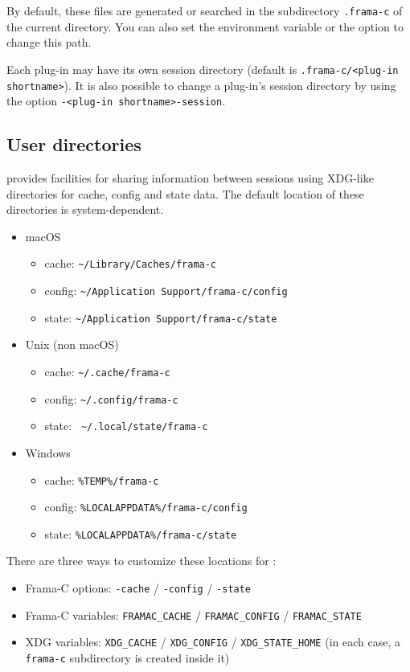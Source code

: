By default, these files are generated or searched in the subdirectory
\texttt{.frama-c} of the current directory. You can also set the environment
variable  or the option  to
change this path.

Each \FramaC plug-in may have its own session directory (default is
\texttt{.frama-c/<plug-in shortname>}). It is also possible to change
a plug-in's session directory by using the option \texttt{-<plug-in
  shortname>-session}.

\subsection{User directories}\label{sec:var-user-dirs}

\FramaC provides facilities for sharing information between sessions using
XDG-like directories for cache, config and state data. The default location of
these directories is system-dependent.

\begin{itemize}
  \item macOS
  \begin{itemize}
    \item cache: \lstinline{~/Library/Caches/frama-c}
    \item config: \lstinline{~/Application Support/frama-c/config}
    \item state: \lstinline{~/Application Support/frama-c/state}
  \end{itemize}
  \item Unix (non macOS)
  \begin{itemize}
    \item cache: \lstinline{~/.cache/frama-c}
    \item config: \lstinline{~/.config/frama-c}
    \item state: \lstinline{ ~/.local/state/frama-c}
  \end{itemize}
  \item Windows
  \begin{itemize}
    \item cache: \lstinline{%TEMP%/frama-c}
    \item config: \lstinline{%LOCALAPPDATA%/frama-c/config}
    \item state: \lstinline{%LOCALAPPDATA%/frama-c/state}
  \end{itemize}
\end{itemize}

There are three ways to customize these locations for \FramaC:
\begin{itemize}
  \item Frama-C options: \lstinline{-cache} / \lstinline{-config} / \lstinline{-state}
  \item Frama-C variables: \lstinline{FRAMAC_CACHE} / \lstinline{FRAMAC_CONFIG} / \lstinline{FRAMAC_STATE}
  \item XDG variables: \lstinline{XDG_CACHE} / \lstinline{XDG_CONFIG} / \lstinline{XDG_STATE_HOME}
    (in each case, a \lstinline{frama-c} subdirectory is created inside it)
\end{itemize}

